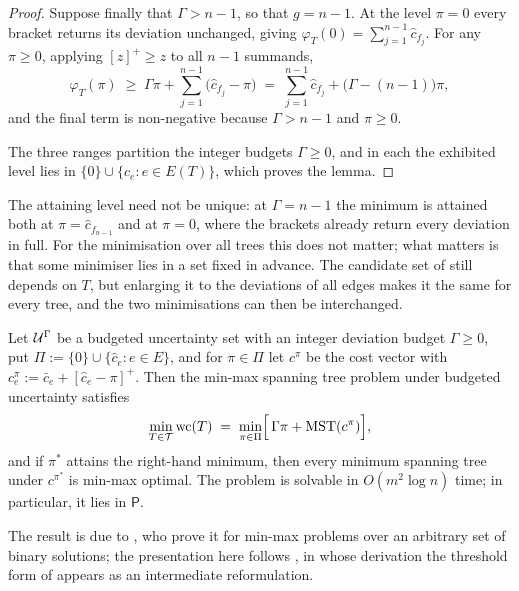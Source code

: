 \begin{proof}
Suppose finally that $\Gamma > n-1$, so that $g = n-1$.
At the level $\pi = 0$ every bracket returns its deviation unchanged, giving $\varphi_T(0) = \sum_{j=1}^{n-1} \hat{c}_{f_j}$.
For any $\pi \geq 0$, applying $[z]^{+} \geq z$ to all $n-1$ summands,
\[
\varphi_T(\pi) \;\geq\; \Gamma\pi + \sum_{j=1}^{n-1} \bigl(\hat{c}_{f_j} - \pi\bigr) \;=\; \sum_{j=1}^{n-1} \hat{c}_{f_j} + \bigl(\Gamma - (n-1)\bigr)\pi,
\]
and the final term is non-negative because $\Gamma > n-1$ and $\pi \geq 0$.

The three ranges partition the integer budgets $\Gamma \geq 0$, and in each the exhibited level lies in $\{0\} \cup \{\hat{c}_e : e \in E(T)\}$, which proves the lemma.
\end{proof}

The attaining level need not be unique: at $\Gamma = n-1$ the minimum is attained both at $\pi = \hat{c}_{f_{n-1}}$ and at $\pi = 0$, where the brackets already return every deviation in full.
For the minimisation over all trees this does not matter; what matters is that some minimiser lies in a set fixed in advance.
The candidate set of  still depends on $T$, but enlarging it to the deviations of all edges makes it the same for every tree, and the two minimisations can then be interchanged.

\begin{theorem}\label{thm:mm-budgeted-poly}
Let $\mathcal{U}^{\Gamma}$ be a budgeted uncertainty set with an integer deviation budget $\Gamma \geq 0$, put $\Pi := \{0\} \cup \{\hat{c}_e : e \in E\}$, and for $\pi \in \Pi$ let $c^{\pi}$ be the cost vector with $c^{\pi}_e := \bar{c}_e + [\hat{c}_e - \pi]^{+}$.
Then the min-max spanning tree problem under budgeted uncertainty satisfies
\[
\min_{T \in \mathcal{T}} \mathrm{wc}(T) \;=\; \min_{\pi \in \Pi} \Bigl[\, \Gamma\pi + \mathrm{MST}(c^{\pi}) \Bigr],
\]
and if $\pi^{*}$ attains the right-hand minimum, then every minimum spanning tree under $c^{\pi^{*}}$ is min-max optimal.
The problem is solvable in $O(m^{2} \log n)$ time; in particular, it lies in $\mathsf{P}$.
\end{theorem}

The result is due to \textcite{BertsimasSim2003}, who prove it for min-max problems over an arbitrary set of binary solutions; the presentation here follows \textcite[Theorem~4.21]{Goerigk2021RCO}, in whose derivation the threshold form of  appears as an intermediate reformulation.

